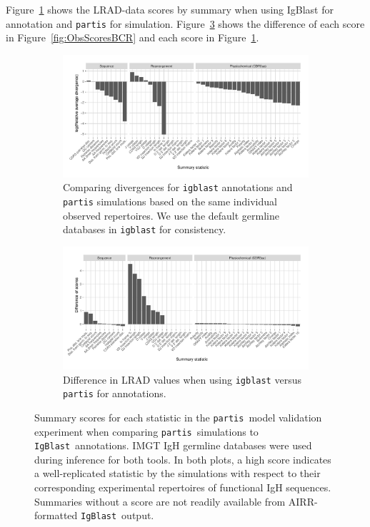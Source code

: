 \documentclass{article}
\newcommand{\partis}{\texttt{partis}}
\newcommand{\igblast}{\texttt{IgBlast}}
\begin{document}
Figure~\ref{fig:IgBlastScores} shows the LRAD-data scores by summary when using IgBlast for annotation and \texttt{partis} for simulation.
Figure~\ref{fig:ScoreDiffs} shows the difference of each score in Figure~\ref{fig:ObsScoresBCR} and each score in Figure~\ref{fig:IgBlastScores}.
\begin{figure}
	\begin{subfigure}{\textwidth}
   		\includegraphics[width=\linewidth]{Figures/PartisScores/obs_score_plot_igb.pdf}
    	\caption{Comparing divergences for \texttt{igblast} annotations and \texttt{partis} simulations based on the same individual observed repertoires.
    	    We use the default germline databases in \texttt{igblast} for consistency.
    	}
    	\label{fig:IgBlastScores}
	\end{subfigure}
	\begin{subfigure}{\textwidth}
   		\includegraphics[width=\linewidth]{Figures/PartisScores/score_diff.pdf}
    	\caption{Difference in LRAD values when using \texttt{igblast} versus \texttt{partis} for annotations.
    	}
    	\label{fig:ScoreDiffs}
	\end{subfigure}
	\caption{Summary scores for each statistic in the \partis\ model validation experiment when comparing \partis\ simulations to \igblast\ annotations.
	IMGT IgH germline databases were used during inference for both tools.
	In both plots, a high score indicates a well-replicated statistic by the simulations with respect to their corresponding experimental repertoires of functional IgH sequences.
	Summaries without a score are not readily available from AIRR-formatted \igblast\ output.
	}
\end{figure}
\end{document}
